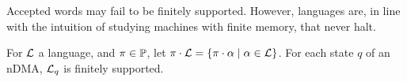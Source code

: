 \noindent Accepted words may fail to be finitely supported. However, languages are, in line with the intuition of studying machines with finite memory, that never halt.

\begin{theorem}\label{thm:languages-finitely-supported}
 For $\mathcal{L}$ a language, and $\pi\in \mathbb{P}$, let $\pi\cdot \mathcal{L} = \{\pi \cdot \alpha \mid \alpha \in \mathcal{L}\}$. For each state $q$ of an nDMA, $\mathcal{L}_{q}$ is finitely supported.
\end{theorem}

